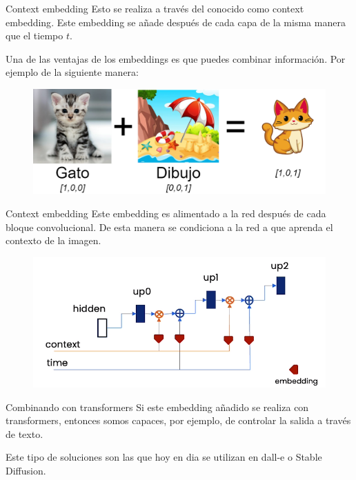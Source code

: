 \begin{frame}{Context embedding}
Esto se realiza a través del conocido como \alert{context embedding}. Este embedding se añade después de cada capa de la misma manera que el \alert{tiempo $t$}.

Una de las ventajas de los embeddings es que puedes \alert{combinar información}. Por ejemplo de la siguiente manera:

\begin{figure}
    \centering
    \includegraphics[width=\textwidth]{figures/Diffusion_Models/Embedding_Combination.png}
\end{figure}
\end{frame}

\begin{frame}{Context embedding}
Este embedding es \alert{alimentado} a la red después de cada bloque convolucional. De esta manera se \alert{condiciona} a la red a que aprenda el contexto de la imagen.

\begin{figure}
    \centering
    \includegraphics[width=\textwidth]{figures/Diffusion_Models/Context_Embedding.png}
    \caption{\cite{DeepLearningDifussionModelCourse}}
\end{figure}
\end{frame}

\begin{frame}{Combinando con transformers}
Si este embedding añadido se realiza con \alert{transformers}, entonces somos capaces, por ejemplo, de controlar la salida a través de texto.

Este tipo de soluciones son las que hoy en dia se utilizan en \alert{dall-e} o \alert{Stable Diffusion}.
\end{frame}

